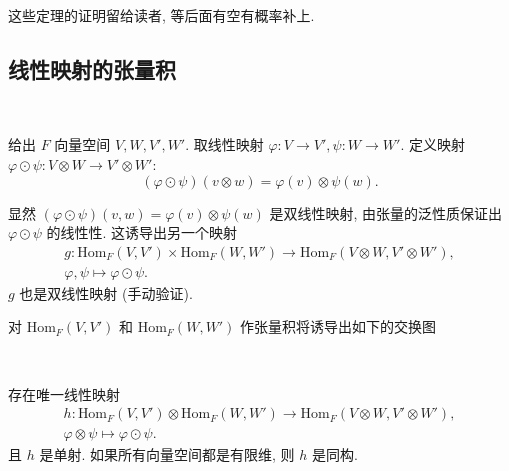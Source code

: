 这些定理的证明留给读者, 等后面有空有概率补上.

\subsection{线性映射的张量积}

\begin{definition}
    \

    给出 $F$ 向量空间 $V,W,V',W'$. 取线性映射 $\varphi:V \to V', \psi:W \to W'$. 定义映射 $\varphi \odot  \psi: V \otimes W \to V' \otimes W'$:
    \vspace{-1em}
    \begin{equation*}
        (\varphi \odot \psi)(v \otimes w) = \varphi(v) \otimes \psi(w).
    \end{equation*}
\end{definition}

显然 $(\varphi \odot \psi)(v,w) = \varphi(v) \otimes \psi(w)$ 是双线性映射, 由张量的泛性质保证出 $\varphi \odot \psi$ 的线性性. 这诱导出另一个映射
\begin{equation*}
   \begin{matrix}
        g:\text{Hom}_F(V,V') \times \text{Hom}_F(W,W') \to \text{Hom}_F(V \otimes W, V' \otimes W'),\\ 
        \varphi,\psi \mapsto \varphi \odot \psi.
    \end{matrix} 
\end{equation*}
$g$ 也是双线性映射 (手动验证).

对 $\text{Hom}_F(V,V')$ 和 $\text{Hom}_F(W,W')$ 作张量积将诱导出如下的交换图

\begin{center}
\end{center}
\begin{theorem}
  \

  存在唯一线性映射
  \begin{equation*}
    \begin{matrix}
        h:\text{Hom}_F(V,V') \otimes \text{Hom}_F(W,W') \to \text{Hom}_F(V \otimes W, V' \otimes W'),\\ 
        \varphi \otimes \psi \mapsto \varphi \odot \psi.
    \end{matrix} 
\end{equation*}
且 $h$ 是单射. 如果所有向量空间都是有限维, 则 $h$ 是同构.
\end{theorem}

